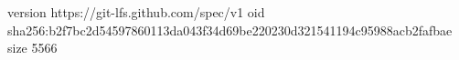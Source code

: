 version https://git-lfs.github.com/spec/v1
oid sha256:b2f7bc2d54597860113da043f34d69be220230d321541194c95988acb2fafbae
size 5566
